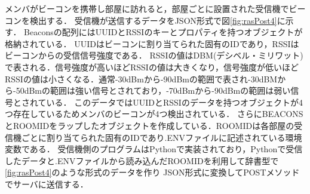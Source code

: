

メンバがビーコンを携帯し部屋に訪れると，部屋ごとに設置された受信機でビーコンを検出する．
受信機が送信するデータをJSON形式で図\ref{fig:rasPost4}に示す．
Beaconsの配列にはUUIDとRSSIのキーとプロパティを持つオブジェクトが格納されている．
UUIDはビーコンに割り当てられた固有のIDであり，RSSIはビーコンからの受信信号強度である．
RSSIの値はDBM(デシベル・ミリワット)で表される．信号強度が高いほどRSSIの値は大きくなり，信号強度が低いほどRSSIの値は小さくなる．通常-30dBmから-90dBmの範囲で表され-30dBMから-50dBmの範囲は強い信号とされており，-70dBmから-90dBmの範囲は弱い信号とされている．
このデータではUUIDとRSSIのデータを持つオブジェクトが4つ存在しているためメンバのビーコンが4つ検出されている．
さらにBEACONSとROOMIDをラップしたオブジェクトを作成している．ROOMIDは各部屋の受信機ごとに割り当てられた固有のIDであり.ENVファイルに記述されている環境変数である．
受信機側のプログラムはPythonで実装されており，Pythonで受信したデータと.ENVファイルから読み込んだROOMIDを利用して辞書型で\ref{fig:rasPost4}のような形式のデータを作り
JSON形式に変換してPOSTメソッドでサーバに送信する．


